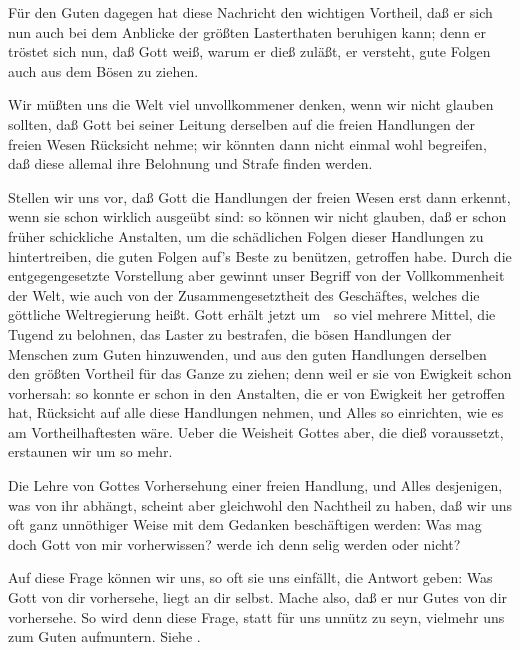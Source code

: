 \begin{aufza}
\begin{aufzb}
\item Für den Guten dagegen hat diese Nachricht den wichtigen Vortheil, daß er sich nun auch bei dem Anblicke der größten Lasterthaten beruhigen kann; denn er tröstet sich nun, daß Gott weiß, warum er dieß zuläßt, er versteht, gute Folgen auch aus dem Bösen zu ziehen.
\end{aufzb}
\item Wir müßten uns die Welt viel unvollkommener denken, wenn wir nicht glauben sollten, daß Gott bei seiner Leitung derselben auf die freien Handlungen der freien Wesen Rücksicht nehme; wir könnten dann nicht einmal wohl begreifen, daß diese allemal ihre Belohnung und Strafe finden werden.
\item Stellen wir uns vor, daß Gott die Handlungen der freien Wesen erst dann erkennt, wenn sie schon wirklich ausgeübt sind: so können wir nicht glauben, daß er schon früher schickliche Anstalten, um die schädlichen Folgen dieser Handlungen zu hintertreiben, die guten Folgen auf's Beste zu benützen, getroffen habe. Durch die entgegengesetzte Vorstellung aber gewinnt unser Begriff von der Vollkommenheit der Welt, wie auch von der Zusammengesetztheit des Geschäftes, welches die göttliche Weltregierung heißt. Gott erhält jetzt um~\ so viel mehrere Mittel, die Tugend zu belohnen, das Laster zu bestrafen, die bösen Handlungen der Menschen zum Guten hinzuwenden, und aus den guten Handlungen derselben den größten Vortheil für das Ganze zu ziehen; denn weil er sie von Ewigkeit schon vorhersah: so konnte er schon in den Anstalten, die er von Ewigkeit her getroffen hat, Rücksicht auf alle diese Handlungen nehmen, und Alles so einrichten, wie es am Vortheilhaftesten wäre. Ueber die Weisheit Gottes aber, die dieß voraussetzt, erstaunen wir um so mehr.\par
\end{aufza}
 Die Lehre von Gottes Vorhersehung einer freien Handlung, und Alles desjenigen, was von ihr abhängt, scheint aber gleichwohl den Nachtheil zu haben, daß wir uns oft ganz unnöthiger Weise mit dem Gedanken beschäftigen werden: Was mag doch Gott von mir vorherwissen? werde ich denn selig werden oder nicht?\par
{} Auf diese Frage können wir uns, so oft sie uns einfällt, die Antwort geben: Was Gott von dir vorhersehe, liegt an dir selbst. Mache also, daß er nur Gutes von dir vorhersehe. So wird denn diese Frage, statt für uns unnütz zu seyn, vielmehr uns zum Guten aufmuntern. Siehe .

